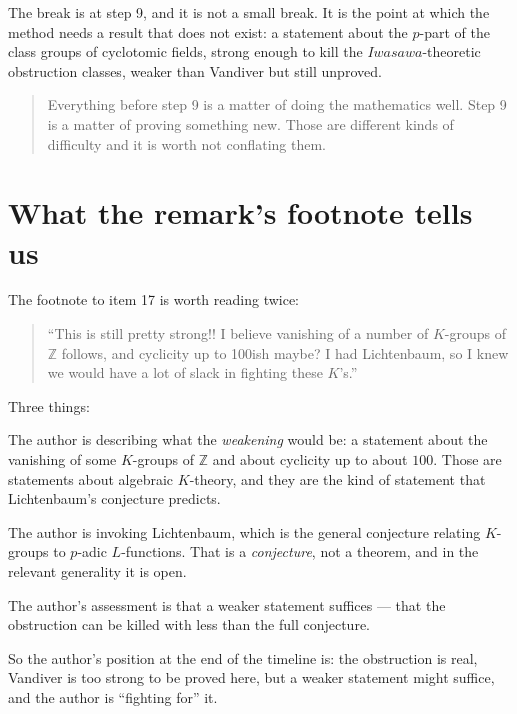 The break is at step 9, and it is not a small break. It is the point at which
the method needs a result that does not exist: a statement about the
$p$-part of the class groups of cyclotomic fields, strong enough to kill the
$Iwasawa$-theoretic obstruction classes, weaker than Vandiver but still
unproved.

\begin{quote}
Everything before step 9 is a matter of doing the mathematics well. Step 9 is
a matter of proving something new. Those are different kinds of difficulty
and it is worth not conflating them.
\end{quote}

\section{What the remark's footnote tells us}The footnote to item 17 is worth reading twice:

\begin{quote}
\small
``This is still pretty strong!! I believe vanishing of a number of $K$-groups
of $\mathbb{Z}$ follows, and cyclicity up to 100ish maybe? I had Lichtenbaum,
so I knew we would have a lot of slack in fighting these $K$'s.''
\end{quote}

Three things:

\begin{description}[style=nextline,leftmargin=0pt,labelwidth=0pt,labelsep=0pt,font=\sffamily\bfseries\small,
  itemsep=6pt]
\item[``This is still pretty strong!!''] The author is describing what the
\emph{weakening} would be: a statement about the vanishing of some
$K$-groups of $\mathbb{Z}$ and about cyclicity up to about $100$. Those are
statements about algebraic $K$-theory, and they are the kind of statement that
Lichtenbaum's conjecture predicts.
\item[``I had Lichtenbaum''] The author is invoking Lichtenbaum, which is the
general conjecture relating $K$-groups to $p$-adic $L$-functions. That is a
\emph{conjecture}, not a theorem, and in the relevant generality it is open.
\item[``a lot of slack in fighting these $K$'s''] The author's assessment is
that a weaker statement suffices --- that the obstruction can be killed with
less than the full conjecture.
\end{description}

So the author's position at the end of the timeline is: the obstruction is real,
Vandiver is too strong to be proved here, but a weaker statement might
suffice, and the author is ``fighting for'' it.

